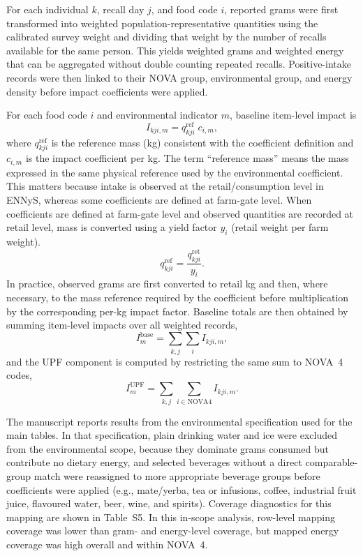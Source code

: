 ﻿\documentclass{article}
\begin{document}
For each individual $k$, recall day $j$, and food code $i$, reported grams were first transformed into weighted population-representative quantities using the calibrated survey weight and dividing that weight by the number of recalls available for the same person. This yields weighted grams and weighted energy that can be aggregated without double counting repeated recalls. Positive-intake records were then linked to their NOVA group, environmental group, and energy density before impact coefficients were applied.

For each food code $i$ and environmental indicator $m$, baseline item-level impact is
\[
I_{kji,m}=q_{kji}^{\mathrm{ref}}\;c_{i,m},
\]
where $q_{kji}^{\mathrm{ref}}$ is the reference mass (kg) consistent with the coefficient definition and $c_{i,m}$ is the impact coefficient per kg. The term ``reference mass'' means the mass expressed in the same physical reference used by the environmental coefficient. This matters because intake is observed at the retail/consumption level in ENNyS, whereas some coefficients are defined at farm-gate level. When coefficients are defined at farm-gate level and observed quantities are recorded at retail level, mass is converted using a yield factor $y_i$ (retail weight per farm weight).
\[
q_{kji}^{\mathrm{ref}}=\frac{q_{kji}^{\mathrm{ret}}}{y_i}.
\]
In practice, observed grams are first converted to retail kg and then, where necessary, to the mass reference required by the coefficient before multiplication by the corresponding per-kg impact factor. Baseline totals are then obtained by summing item-level impacts over all weighted records,
\[
I_m^{\mathrm{base}}=\sum_{k,j}\sum_i I_{kji,m},
\]
and the UPF component is computed by restricting the same sum to NOVA~4 codes,
\[
I_m^{\mathrm{UPF}}=\sum_{k,j}\sum_{i\in \mathrm{NOVA4}} I_{kji,m}.
\]

The manuscript reports results from the environmental specification used for the main tables. In that specification, plain drinking water and ice were excluded from the environmental scope, because they dominate grams consumed but contribute no dietary energy, and selected beverages without a direct comparable-group match were reassigned to more appropriate beverage groups before coefficients were applied (e.g., mate/yerba, tea or infusions, coffee, industrial fruit juice, flavoured water, beer, wine, and spirits). Coverage diagnostics for this mapping are shown in Table~S5. In this in-scope analysis, row-level mapping coverage was lower than gram- and energy-level coverage, but mapped energy coverage was high overall and within NOVA~4.
\end{document}
